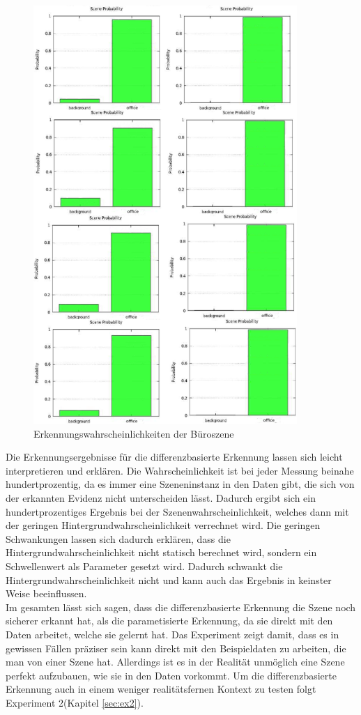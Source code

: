 \begin{figure}
	\centering
	\includegraphics[width=10cm]{bilder/buerowahrscheinlichkeit.pdf}
	\caption{Erkennungswahrscheinlichkeiten der B{\"u}roszene}
	\label{img:buerowahrscheinlichkeit}
\end{figure}
Die Erkennungsergebnisse für die differenzbasierte Erkennung lassen sich leicht interpretieren und erklären. Die Wahrscheinlichkeit ist bei jeder Messung beinahe hundertprozentig, da es immer eine Szeneninstanz in den Daten gibt, die sich von der erkannten Evidenz nicht unterscheiden lässt. Dadurch ergibt sich ein hundertprozentiges Ergebnis bei der Szenenwahrscheinlichkeit, welches dann mit der geringen Hintergrundwahrscheinlichkeit verrechnet wird. Die geringen Schwankungen lassen sich dadurch erklären, dass die Hintergrundwahrscheinlichkeit nicht statisch berechnet wird, sondern ein Schwellenwert als Parameter gesetzt wird. Dadurch schwankt die Hintergrundwahrscheinlichkeit nicht und kann auch das Ergebnis in keinster Weise beeinflussen.\smallskip\\
Im gesamten lässt sich sagen, dass die differenzbasierte Erkennung die Szene noch sicherer erkannt hat, als die parametisierte Erkennung, da sie direkt mit den Daten arbeitet, welche sie gelernt hat. Das Experiment zeigt damit, dass es in gewissen Fällen präziser sein kann direkt mit den Beispieldaten zu arbeiten, die man von einer Szene hat. Allerdings ist es in der Realität unmöglich eine Szene perfekt aufzubauen, wie sie in den Daten vorkommt. Um die differenzbasierte Erkennung auch in einem weniger realitätsfernen Kontext zu testen folgt Experiment 2(Kapitel \ref{sec:ex2}).
